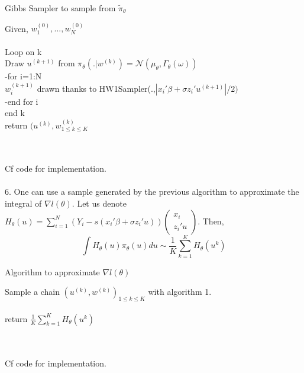 \begin{algorithm}
	\caption{Gibbs Sampler to sample from $\tilde{\pi}_{\theta}$}\label{RS}
	Given, $w_{1}^{(0)}, ..., w_{N}^{(0)}$~\\
	~\\
	Loop on k~\\
	Draw $u^{(k+1)}$ from $\pi_{\theta}(. | w^{(k)}) = \mathcal{N}(\mu_{\theta},\Gamma_{\theta}(\omega))$~\\
	-for i=1:N~\\
	$w_{i}^{(k+1)}$ drawn thanks to HW1Sampler(.,$|x_i'\beta + \sigma z_i' u^{(k+1)}|/2)$\\
	-end for i~\\
	end k~\\
	return $(u^{(k)},w^{(k)}_{1\leq k \leq K}$
\end{algorithm}~\\
~\\
Cf code for implementation.~\\
~\\
6. One can use a sample generated by the previous algorithm to approximate the integral of $\nabla l(\theta)$.
Let us denote $H_{\theta}(u)=\sum_{i=1}^{N}(Y_i-s(x_i'\beta+\sigma z_i'u)) \left(
\begin{smallmatrix}
x_i\\ z_i'u
\end{smallmatrix}
\right)$. Then, 
$$\int H_{\theta}(u)\pi_{\theta}(u)du   \sim \frac{1}{K}\sum_{k=1}^{K} H_{\theta}(u^k) $$
\begin{algorithm}
	\caption{Algorithm to approximate $ \nabla l(\theta)$}\label{RS}
	Sample a chain $(u^{(k)},w^{(k)})_{1\leq k \leq K}$ with algorithm 1.~\\
	~\\
	return $\frac{1}{K}\sum_{k=1}^{K} H_{\theta}(u^k)$
\end{algorithm}~\\
~\\	
Cf code for implementation.